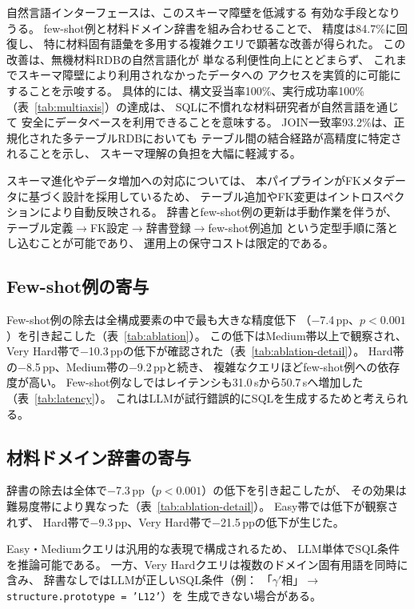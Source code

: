 \documentclass[5p,twocolumn]{elsarticle}
\begin{document}
自然言語インターフェースは、このスキーマ障壁を低減する
有効な手段となりうる。
few-shot例と材料ドメイン辞書を組み合わせることで、
精度は84.7\%に回復し、
特に材料固有語彙を多用する複雑クエリで顕著な改善が得られた。
この改善は、無機材料RDBの自然言語化が
単なる利便性向上にとどまらず、
これまでスキーマ障壁により利用されなかったデータへの
アクセスを実質的に可能にすることを示唆する。
具体的には、構文妥当率100\%、実行成功率100\%
（表~\ref{tab:multiaxis}）の達成は、
SQLに不慣れな材料研究者が自然言語を通じて
安全にデータベースを利用できることを意味する。
JOIN一致率93.2\%は、正規化された多テーブルRDBにおいても
テーブル間の結合経路が高精度に特定されることを示し、
スキーマ理解の負担を大幅に軽減する。

スキーマ進化やデータ増加への対応については、
本パイプラインがFKメタデータに基づく設計を採用しているため、
テーブル追加やFK変更はイントロスペクションにより自動反映される。
辞書とfew-shot例の更新は手動作業を伴うが、
テーブル定義$\to$FK設定$\to$辞書登録$\to$few-shot例追加
という定型手順に落とし込むことが可能であり、
運用上の保守コストは限定的である。

\subsection{Few-shot例の寄与}

Few-shot例の除去は全構成要素の中で最も大きな精度低下
（$-$7.4\,pp、$p<0.001$）を引き起こした（表~\ref{tab:ablation}）。
この低下はMedium帯以上で観察され、
Very Hard帯で$-$10.3\,ppの低下が確認された（表~\ref{tab:ablation-detail}）。
Hard帯の$-$8.5\,pp、Medium帯の$-$9.2\,ppと続き、
複雑なクエリほどfew-shot例への依存度が高い。
Few-shot例なしではレイテンシも31.0\,sから50.7\,sへ増加した（表~\ref{tab:latency}）。
これはLLMが試行錯誤的にSQLを生成するためと考えられる。

\subsection{材料ドメイン辞書の寄与}

辞書の除去は全体で$-$7.3\,pp（$p<0.001$）の低下を引き起こしたが、
その効果は難易度帯により異なった（表~\ref{tab:ablation-detail}）。
Easy帯では低下が観察されず、
Hard帯で$-$9.3\,pp、Very Hard帯で$-$21.5\,ppの低下が生じた。

Easy・Mediumクエリは汎用的な表現で構成されるため、
LLM単体でSQL条件を推論可能である。
一方、Very Hardクエリは複数のドメイン固有用語を同時に含み、
辞書なしではLLMが正しいSQL条件（例：
「$\gamma'$相」$\to$\texttt{structure.prototype = 'L12'}）を
生成できない場合がある。
\end{document}

